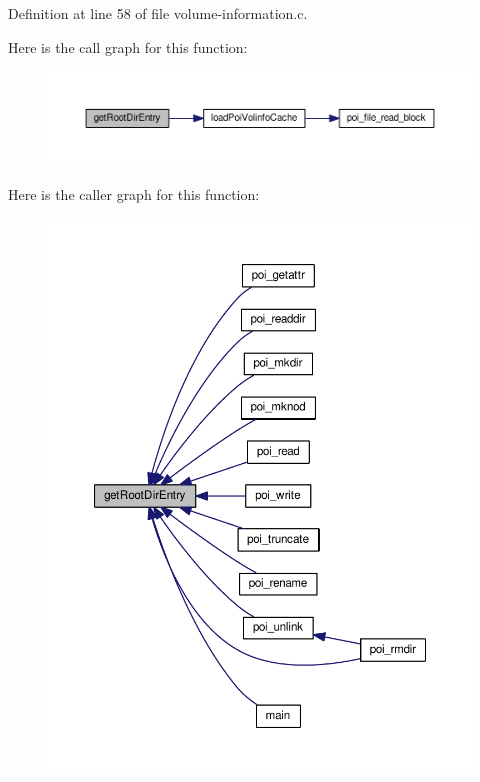 Definition at line 58 of file volume-\/information.\-c.



Here is the call graph for this function\-:
\nopagebreak
\begin{figure}[H]
\begin{center}
\leavevmode
\includegraphics[width=350pt]{volume-information_8h_a32c12de0ce0f231386676aca679e459e_cgraph}
\end{center}
\end{figure}




Here is the caller graph for this function\-:
\nopagebreak
\begin{figure}[H]
\begin{center}
\leavevmode
\includegraphics[width=350pt]{volume-information_8h_a32c12de0ce0f231386676aca679e459e_icgraph}
\end{center}
\end{figure}



